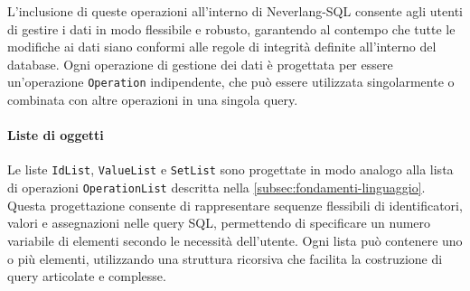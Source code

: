 \documentclass[12pt,a4paper,openright,twoside]{book}
\begin{document}
L’inclusione di queste operazioni all’interno di Neverlang-SQL consente agli utenti di gestire i dati in modo flessibile e robusto, 
garantendo al contempo che tutte le modifiche ai dati siano conformi alle regole di integrità definite all’interno del database. 
Ogni operazione di gestione dei dati è progettata per essere un’operazione \texttt{Operation} indipendente, che può essere 
utilizzata singolarmente o combinata con altre operazioni in una singola query.

\paragraph{Liste di oggetti}
Le liste \texttt{IdList}, \texttt{ValueList} e \texttt{SetList} sono progettate in modo analogo alla lista di operazioni 
\texttt{OperationList} descritta nella \cref{subsec:fondamenti-linguaggio}. Questa progettazione consente di rappresentare sequenze 
flessibili di identificatori, valori e assegnazioni nelle query SQL, permettendo di specificare un numero variabile di elementi 
secondo le necessità dell’utente. Ogni lista può contenere uno o più elementi, utilizzando una struttura ricorsiva che facilita la 
costruzione di query articolate e complesse.
\end{document}
